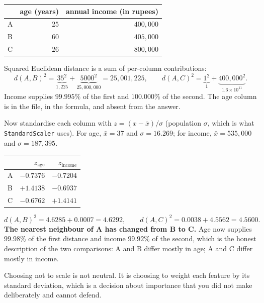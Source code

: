 \documentclass[11pt]{article}
\begin{document}
\begin{worked}
\begin{center}
\begin{tabular}{@{}lrr@{}}
\toprule
& \textbf{age} (years) & \textbf{annual income} (in rupees)\\
\midrule
A & $25$ & $400{,}000$\\
B & $60$ & $405{,}000$\\
C & $26$ & $800{,}000$\\
\bottomrule
\end{tabular}
\end{center}
Squared Euclidean distance is a sum of per-column contributions:
\[
  d(A,B)^2 = \underbrace{35^2}_{1{,}225} +
             \underbrace{5000^2}_{25{,}000{,}000} = 25{,}001{,}225,
  \qquad
  d(A,C)^2 = \underbrace{1^2}_{1} +
             \underbrace{400{,}000^2}_{1.6\times 10^{11}} .
\]
Income supplies $99.995\%$ of the first and $100.000\%$ of the second. The age
column is in the file, in the formula, and absent from the answer.

Now standardise each column with $z = (x-\bar x)/\sigma$ (population $\sigma$,
which is what \texttt{StandardScaler} uses). For age, $\bar x = 37$ and
$\sigma = 16.269$; for income, $\bar x = 535{,}000$ and $\sigma = 187{,}395$.
\begin{center}
\begin{tabular}{@{}lrr@{}}
\toprule
& $z_{\text{age}}$ & $z_{\text{income}}$\\
\midrule
A & $-0.7376$ & $-0.7204$\\
B & $+1.4138$ & $-0.6937$\\
C & $-0.6762$ & $+1.4141$\\
\bottomrule
\end{tabular}
\end{center}
\[
  d(A,B)^2 = 4.6285 + 0.0007 = 4.6292, \qquad
  d(A,C)^2 = 0.0038 + 4.5562 = 4.5600 .
\]
\textbf{The nearest neighbour of A has changed from B to C.} Age now supplies
$99.98\%$ of the first distance and income $99.92\%$ of the second, which is
the honest description of the two comparisons: A and B differ mostly in age;
A and C differ mostly in income.
\end{worked}

\begin{keyidea}
Choosing not to scale is not neutral. It is choosing to weight each feature by
its standard deviation, which is a decision about importance that you did not
make deliberately and cannot defend.
\end{keyidea}
\end{document}
